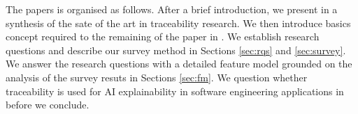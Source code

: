 

The papers is organised as follows. After a brief introduction, we present in  a synthesis of the sate of the art in traceability research. We then introduce basics concept required to the remaining of the paper in . We establish research questions and describe our survey method in Sections \ref{sec:rqs} and \ref{sec:survey}. We answer the research questions with a detailed feature model grounded on the analysis of the survey resuts in Sections \ref{sec:fm}. 
We question whether traceability is used for AI explainability in software engineering applications in  before we conclude.

